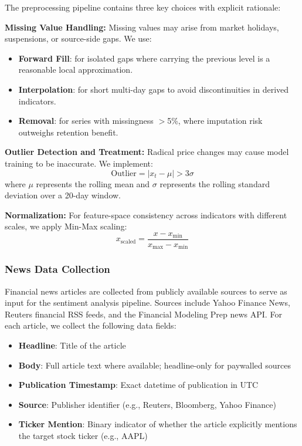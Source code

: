 \documentclass[12pt,a4paper]{article}
\begin{document}
The preprocessing pipeline contains three key choices with explicit rationale:

\textbf{Missing Value Handling:}
Missing values may arise from market holidays, suspensions, or source-side gaps. We use:
\begin{itemize}
    \item \textbf{Forward Fill}: for isolated gaps where carrying the previous level is a reasonable local approximation.
    \item \textbf{Interpolation}: for short multi-day gaps to avoid discontinuities in derived indicators.
    \item \textbf{Removal}: for series with missingness $>$5\%, where imputation risk outweighs retention benefit.
\end{itemize}

\textbf{Outlier Detection and Treatment:}
Radical price changes may cause model training to be inaccurate. We implement:
\begin{equation}
\text{Outlier} = |x_t - \mu| > 3\sigma
\end{equation}
where $\mu$ represents the rolling mean and $\sigma$ represents the rolling standard deviation over a 20-day window.

\textbf{Normalization:}
For feature-space consistency across indicators with different scales, we apply Min-Max scaling:
\begin{equation}
x_{\text{scaled}} = \frac{x - x_{\min}}{x_{\max} - x_{\min}}
\end{equation}

\subsubsection{News Data Collection}

Financial news articles are collected from publicly available sources to serve as input for the sentiment analysis pipeline. Sources include Yahoo Finance News, Reuters financial RSS feeds, and the Financial Modeling Prep news API. For each article, we collect the following data fields:

\begin{itemize}
    \item \textbf{Headline}: Title of the article
    \item \textbf{Body}: Full article text where available; headline-only for paywalled sources
    \item \textbf{Publication Timestamp}: Exact datetime of publication in UTC
    \item \textbf{Source}: Publisher identifier (e.g., Reuters, Bloomberg, Yahoo Finance)
    \item \textbf{Ticker Mention}: Binary indicator of whether the article explicitly mentions the target stock ticker (e.g., AAPL)
\end{itemize}
\end{document}
